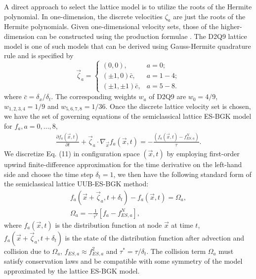 \documentclass[doublecol]{epl2}
\begin{document}
A direct approach to select the lattice model is to utilize the roots of the Hermite polynomial. In one-dimension, the discrete velocities $\zeta_a$ are just the roots of the Hermite polynomials.  Given one-dimensional velocity sets, those of the higher-dimension can be constructed using the production formulae \cite{Shan2006}.  The D2Q9 lattice model is one of such models that can be derived using Gauss-Hermite quadrature rule and is specified by
\begin{equation}
\vec \zeta_a =
  \begin{cases}
   (0, 0), & a =0; \\
   (\pm 1, 0) \bar{c}, &  a=1-4; \\
   (\pm 1, \pm 1) \bar{c}, & a=5-8.
  \end{cases}
\end{equation}
where $\bar{c} = \delta_x/\delta_t$. The corresponding weights $w_a$ of D2Q9 are $w_0=4/9$, $w_{1,2,3,4}=1/9$ and $w_{5,6,7,8}=1/36$.
Once the discrete lattice velocity set is chosen, we have the set of governing equations of the semiclassical lattice ES-BGK model for $f_a, a=0, ..., 8$,
\begin{align}
\frac{\partial f_a (\vec x, t)}{\partial t} + \vec \zeta_a \cdot
\nabla_{\vec x} f_a( \vec x, t) =  -\frac{(f_a(\vec x, t) - f^{N}_{ES,a})}{\tau}.
\end{align}
We discretize Eq. (11) in configuration space $(\vec x,t)$ by employing first-order upwind finite-difference approximation for
the time derivative on the left-hand side and choose the time step $\delta_t = 1$, we then have the following standard form of the
semiclassical lattice UUB-ES-BGK method:
\begin{align}
f_a(\vec x+ \vec \zeta_a, t+\delta_t)- f_a(\vec x,t)=\Omega_a,\nonumber \\
\Omega_a = -\frac{1}{\tau^*}[f_a - f^{N}_{ES,a}],
\end{align}
where $f_a(\vec x,t)$ is the distribution function at node $\vec x$ at time $t$, $f_a(\vec x+ \vec \zeta_a, t+\delta_t)$ is the state of the distribution function after advection and collision due to $\Omega_a$, $f_{ES,a} \approx f_{ES,a}^{2}$ and $\tau^*= \tau/\delta_t$.  The collision term $\Omega_a$ must satisfy conservation laws and be compatible with some symmetry of the model approximated by the lattice ES-BGK model.
\end{document}
